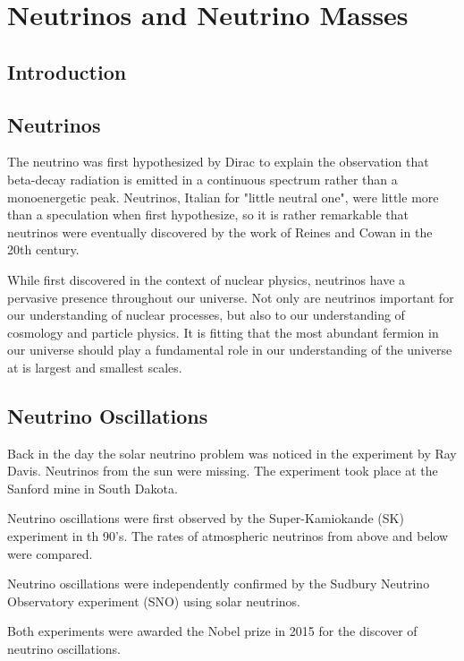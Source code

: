 
\chapter{Neutrinos and Neutrino Masses}

\section{Introduction}



\section{Neutrinos}

The neutrino was first hypothesized by Dirac to explain the observation that beta-decay radiation is emitted in a continuous spectrum rather than a monoenergetic peak. Neutrinos, Italian for "little neutral one", were little more than a speculation when first hypothesize, so it is rather remarkable that neutrinos were eventually discovered by the work of Reines and Cowan in the 20th century. 

While first discovered in the context of nuclear physics, neutrinos have a pervasive presence throughout our universe. Not only are neutrinos important for our understanding of nuclear processes, but also to our understanding of cosmology and particle physics. It is fitting that the most abundant fermion in our universe should play a fundamental role in our understanding of the universe at is largest and smallest scales.

\section{Neutrino Oscillations}

Back in the day the solar neutrino problem was noticed in the experiment by Ray Davis. Neutrinos from the sun were missing. The experiment took place at the Sanford mine in South Dakota.

Neutrino oscillations were first observed by the Super-Kamiokande (SK) experiment in th 90's. The rates of atmospheric neutrinos from above and below were compared.

Neutrino oscillations were independently confirmed by the Sudbury Neutrino Observatory experiment (SNO) using solar neutrinos. 

Both experiments were awarded the Nobel prize in 2015 for the discover of neutrino oscillations.

